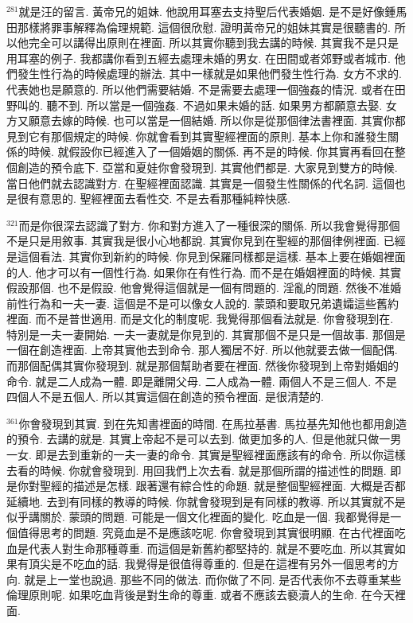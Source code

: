 \documentclass{book}
\begin{document}
$^{281}$就是汪的留言.
黃帝兄的姐妹.
他說用耳塞去支持聖后代表婚姻.
是不是好像鍾馬田那樣將罪事解釋為倫理規範.
這個很欣慰.
證明黃帝兄的姐妹其實是很聽書的.
所以他完全可以講得出原則在裡面.
所以其實你聽到我去講的時候.
其實我不是只是用耳塞的例子.
我都講你看到五經去處理未婚的男女.
在田間或者郊野或者城市.
他們發生性行為的時候處理的辦法.
其中一樣就是如果他們發生性行為.
女方不求的.
代表她也是願意的.
所以他們需要結婚.
不是需要去處理一個強姦的情況.
或者在田野叫的.
聽不到.
所以當是一個強姦.
不過如果未婚的話.
如果男方都願意去娶.
女方又願意去嫁的時候.
也可以當是一個結婚.
所以你是從那個律法書裡面.
其實你都見到它有那個規定的時候.
你就會看到其實聖經裡面的原則.
基本上你和誰發生關係的時候.
就假設你已經進入了一個婚姻的關係.
再不是的時候.
你其實再看回在整個創造的預令底下.
亞當和夏娃你會發現到.
其實他們都是.
大家見到雙方的時候.
當日他們就去認識對方.
在聖經裡面認識.
其實是一個發生性關係的代名詞.
這個也是很有意思的.
聖經裡面去看性交.
不是去看那種純粹快感.

$^{321}$而是你很深去認識了對方.
你和對方進入了一種很深的關係.
所以我會覺得那個不是只是用敘事.
其實我是很小心地都說.
其實你見到在聖經的那個律例裡面.
已經是這個看法.
其實你到新約的時候.
你見到保羅同樣都是這樣.
基本上要在婚姻裡面的人.
他才可以有一個性行為.
如果你在有性行為.
而不是在婚姻裡面的時候.
其實假設那個.
也不是假設.
他會覺得這個就是一個有問題的.
淫亂的問題.
然後不准婚前性行為和一夫一妻.
這個是不是可以像女人說的.
蒙頭和要取兄弟遺孀這些舊約裡面.
而不是普世適用.
而是文化的制度呢.
我覺得那個看法就是.
你會發現到在.
特別是一夫一妻開始.
一夫一妻就是你見到的.
其實那個不是只是一個故事.
那個是一個在創造裡面.
上帝其實他去到命令.
那人獨居不好.
所以他就要去做一個配偶.
而那個配偶其實你發現到.
就是那個幫助者要在裡面.
然後你發現到上帝對婚姻的命令.
就是二人成為一體.
即是離開父母.
二人成為一體.
兩個人不是三個人.
不是四個人不是五個人.
所以其實這個在創造的預令裡面.
是很清楚的.

$^{361}$你會發現到其實.
到在先知書裡面的時間.
在馬拉基書.
馬拉基先知他也都用創造的預令.
去講的就是.
其實上帝起不是可以去到.
做更加多的人.
但是他就只做一男一女.
即是去到重新的一夫一妻的命令.
其實是聖經裡面應該有的命令.
所以你這樣去看的時候.
你就會發現到.
用回我們上次去看.
就是那個所謂的描述性的問題.
即是你對聖經的描述是怎樣.
跟著還有綜合性的命題.
就是整個聖經裡面.
大概是否都延續地.
去到有同樣的教導的時候.
你就會發現到是有同樣的教導.
所以其實就不是似乎講關於.
蒙頭的問題.
可能是一個文化裡面的變化.
吃血是一個.
我都覺得是一個值得思考的問題.
究竟血是不是應該吃呢.
你會發現到其實很明顯.
在古代裡面吃血是代表人對生命那種尊重.
而這個是新舊約都堅持的.
就是不要吃血.
所以其實如果有頂尖是不吃血的話.
我覺得是很值得尊重的.
但是在這裡有另外一個思考的方向.
就是上一堂也說過.
那些不同的做法.
而你做了不同.
是否代表你不去尊重某些倫理原則呢.
如果吃血背後是對生命的尊重.
或者不應該去褻瀆人的生命.
在今天裡面.
\end{document}
